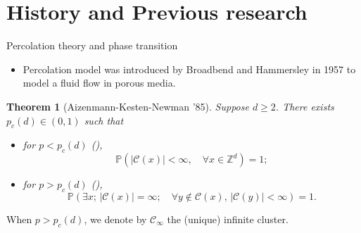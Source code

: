 \documentclass[10pt]{beamer}
\newtheorem{thm}{Theorem}
\renewcommand{\P}{\mathbb{P
}}
\newcommand{\Z}{\mathbb{Z}}
\newcommand{\kG}{\mathcal{G}}
\newcommand{\kC}{\mathcal{C}}
\begin{document}
\section{History and Previous research}
\begin{frame}{Percolation theory and phase transition}
\begin{itemize}
    \item Percolation model was introduced by Broadbend and Hammersley in 1957 to model a fluid flow in porous media.
\end{itemize}

\begin{thm}[Aizenmann-Kesten-Newman '85]
Suppose $d\geq 2$. There exists $p_c(d)\in (0,1)$ such that
\begin{itemize}
    \item for $p<p_c(d)$ ({\color{red}{subcritical regime}}),
$$
  \P(|\kC(x)|<\infty,\quad\forall x\in \Z^d)=1;$$
   \item for $p>p_c(d)$ ({\color{red}{supercritical regime}}),
  $$\P(\exists x;\,|\kC(x)|=\infty;\quad\forall y\notin\kC(x), \,|\kC(y)|<\infty)=1.
$$
\end{itemize}
\end{thm}
When $p>p_c(d)$, we denote by $\mathcal{C}_\infty$ the (unique) infinite cluster.
\end{frame}
\end{document}
